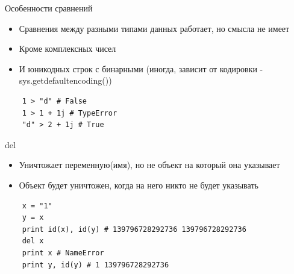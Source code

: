 \documentclass{article}
\begin{document}
\begin{center} Особенности сравнений \end{center}
\begin{itemize}
	\item Сравнения между разными типами данных работает, но смысла не имеет
	\item Кроме комплексных чисел
	\item И юникодных строк с бинарными 
			(иногда, зависит от кодировки - sys.getdefaultencoding())
\end{itemize}
\begin{lstlisting}
	1 > "d" # False
	1 > 1 + 1j # TypeError
	"d" > 2 + 1j # True
\end{lstlisting}
\newpage

\begin{center} del \end{center}
\begin{itemize}
	\item Уничтожает переменную(имя), но не объект на который она указывает
	\item Объект будет уничтожен, когда на него никто не будет указывать
\end{itemize}
\begin{lstlisting}
	x = "1"
	y = x
	print id(x), id(y) # 139796728292736 139796728292736
	del x
	print x # NameError
	print y, id(y) # 1 139796728292736
\end{lstlisting}
\newpage

\end{document}
